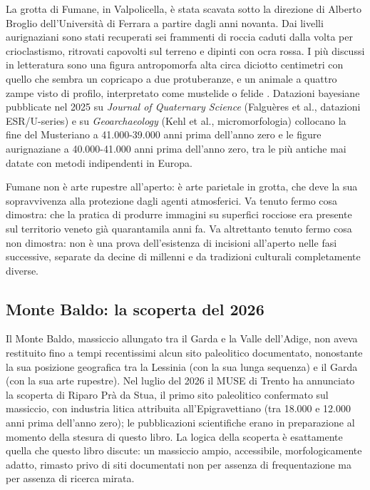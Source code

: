 La grotta di Fumane, in Valpolicella, è stata scavata sotto la direzione di Alberto Broglio dell'Università di Ferrara a partire dagli anni novanta. Dai livelli aurignaziani sono stati recuperati sei frammenti di roccia caduti dalla volta per crioclastismo, ritrovati capovolti sul terreno e dipinti con ocra rossa. I più discussi in letteratura sono una figura antropomorfa alta circa diciotto centimetri con quello che sembra un copricapo a due protuberanze, e un animale a quattro zampe visto di profilo, interpretato come mustelide o felide \citep{broglio2003, broglio2005}. Datazioni bayesiane pubblicate nel 2025 su \emph{Journal of Quaternary Science} (Falguères et al., datazioni ESR/U-series) e su \emph{Geoarchaeology} (Kehl et al., micromorfologia) collocano la fine del Musteriano a 41.000-39.000 anni prima dell'anno zero e le figure aurignaziane a 40.000-41.000 anni prima dell'anno zero, tra le più antiche mai datate con metodi indipendenti in Europa.

Fumane non è arte rupestre all'aperto: è arte parietale in grotta, che deve la sua sopravvivenza alla protezione dagli agenti atmosferici. Va tenuto fermo cosa dimostra: che la pratica di produrre immagini su superfici rocciose era presente sul territorio veneto già quarantamila anni fa. Va altrettanto tenuto fermo cosa non dimostra: non è una prova dell'esistenza di incisioni all'aperto nelle fasi successive, separate da decine di millenni e da tradizioni culturali completamente diverse.

\subsection{Monte Baldo: la scoperta del 2026}

Il Monte Baldo, massiccio allungato tra il Garda e la Valle dell'Adige, non aveva restituito fino a tempi recentissimi alcun sito paleolitico documentato, nonostante la sua posizione geografica tra la Lessinia (con la sua lunga sequenza) e il Garda (con la sua arte rupestre). Nel luglio del 2026 il MUSE di Trento ha annunciato la scoperta di Riparo Prà da Stua, il primo sito paleolitico confermato sul massiccio, con industria litica attribuita all'Epigravettiano (tra 18.000 e 12.000 anni prima dell'anno zero); le pubblicazioni scientifiche erano in preparazione al momento della stesura di questo libro. La logica della scoperta è esattamente quella che questo libro discute: un massiccio ampio, accessibile, morfologicamente adatto, rimasto privo di siti documentati non per assenza di frequentazione ma per assenza di ricerca mirata.


